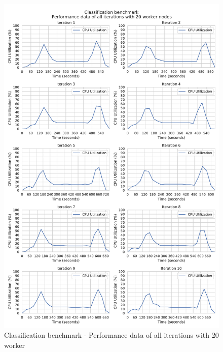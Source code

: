 \begin{figure}[h]
\centering
\includegraphics[scale=0.5]{images/appendix/evaluation_data/classification_benchmark/classification_20_worker_cpu_performance}
\caption{Classification benchmark - Performance data of all iterations with 20 worker}
\label{fig:appendix_eval_classification_static20}
\end{figure}

